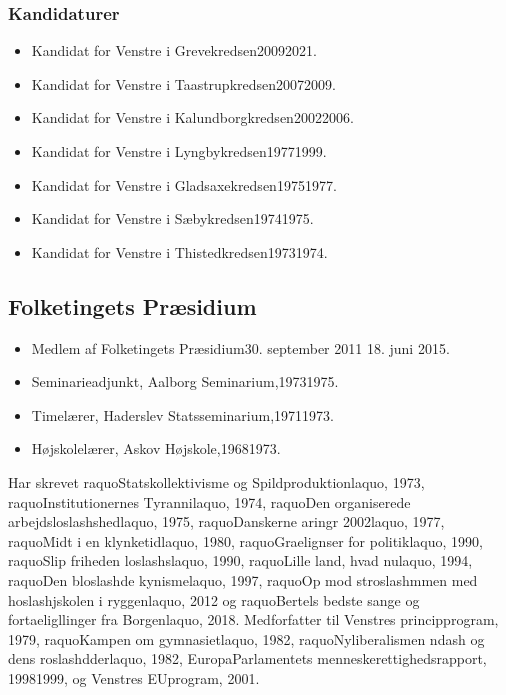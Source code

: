 \documentclass[11pt, a4paper]{awesome-cv}
\begin{document}
\begin{cvletter}
\subsubsection*{Kandidaturer}
\begin{itemize}
\item Kandidat for Venstre i Grevekredsen20092021.
\item Kandidat for Venstre i Taastrupkredsen20072009.
\item Kandidat for Venstre i Kalundborgkredsen20022006.
\item Kandidat for Venstre i Lyngbykredsen19771999.
\item Kandidat for Venstre i Gladsaxekredsen19751977.
\item Kandidat for Venstre i Sæbykredsen19741975.
\item Kandidat for Venstre i Thistedkredsen19731974.
\end{itemize}
\subsection*{Folketingets Præsidium}
\begin{itemize}
\item Medlem af Folketingets Præsidium30. september 2011  18. juni 2015.
\end{itemize}
\begin{itemize}
\item Seminarieadjunkt, Aalborg Seminarium,19731975.
\item Timelærer, Haderslev Statsseminarium,19711973.
\item Højskolelærer, Askov Højskole,19681973.
\end{itemize}
Har skrevet raquoStatskollektivisme og Spildproduktionlaquo, 1973, raquoInstitutionernes Tyrannilaquo, 1974, raquoDen organiserede arbejdsloslashshedlaquo, 1975, raquoDanskerne aringr 2002laquo, 1977, raquoMidt i en klynketidlaquo, 1980, raquoGraelignser for politiklaquo, 1990, raquoSlip friheden loslashslaquo, 1990, raquoLille land, hvad nulaquo, 1994, raquoDen bloslashde kynismelaquo, 1997, raquoOp mod stroslashmmen  med hoslashjskolen i ryggenlaquo, 2012 og raquoBertels bedste  sange og fortaeligllinger fra Borgenlaquo, 2018. Medforfatter til Venstres principprogram, 1979, raquoKampen om gymnasietlaquo, 1982, raquoNyliberalismen ndash og dens roslashdderlaquo, 1982, EuropaParlamentets menneskerettighedsrapport, 19981999, og Venstres EUprogram, 2001.

\end{cvletter}
\end{document}
